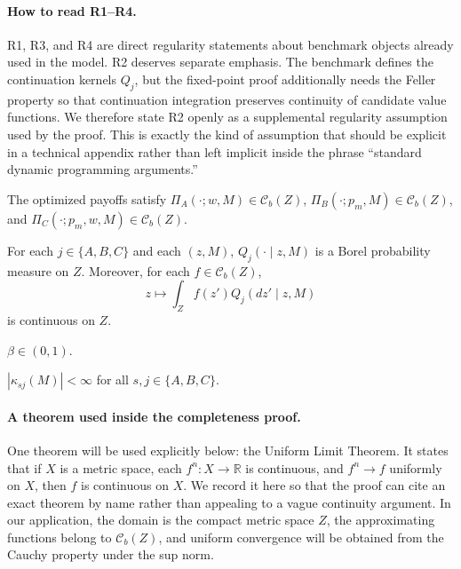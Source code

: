 \paragraph{How to read R1--R4.}
R1, R3, and R4 are direct regularity statements about benchmark objects already used in the model. R2 deserves separate emphasis. The benchmark defines the continuation kernels $Q_j$, but the fixed-point proof additionally needs the Feller property so that continuation integration preserves continuity of candidate value functions. We therefore state R2 openly as a supplemental regularity assumption used by the proof. This is exactly the kind of assumption that should be explicit in a technical appendix rather than left implicit inside the phrase ``standard dynamic programming arguments.''

\begin{assumption}
The optimized payoffs satisfy $\Pi_A(\cdot;w,M)\in\mathcal C_b(Z)$, $\Pi_B(\cdot;p_m,M)\in\mathcal C_b(Z)$, and $\Pi_C(\cdot;p_m,w,M)\in\mathcal C_b(Z)$.
\end{assumption}

\begin{assumption}
For each $j\in\{A,B,C\}$ and each $(z,M)$, $Q_j(\cdot\mid z,M)$ is a Borel probability measure on $Z$. Moreover, for each $f\in\mathcal C_b(Z)$,
\[
z\mapsto\int_Z f(z')Q_j(dz'\mid z,M)
\]
is continuous on $Z$.
\end{assumption}

\begin{assumption}[R3: discounting]
$\beta\in(0,1)$.
\end{assumption}

\begin{assumption}
$|\kappa_{sj}(M)|<\infty$ for all $s,j\in\{A,B,C\}$.
\end{assumption}

\paragraph{A theorem used inside the completeness proof.}
One theorem will be used explicitly below: the Uniform Limit Theorem. It states that if $X$ is a metric space, each $f^n:X\to\mathbb R$ is continuous, and $f^n\to f$ uniformly on $X$, then $f$ is continuous on $X$. We record it here so that the proof can cite an exact theorem by name rather than appealing to a vague continuity argument. In our application, the domain is the compact metric space $Z$, the approximating functions belong to $\mathcal C_b(Z)$, and uniform convergence will be obtained from the Cauchy property under the sup norm.

